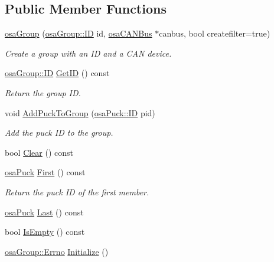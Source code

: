 \subsection*{Public Member Functions}
\begin{DoxyCompactItemize}
\item 
\hyperlink{classosa_group_a625dc997d81d164cdb1a1069cd3e35af}{osa\+Group} (\hyperlink{classosa_group_a642da327f9e3c40d46293432b949f199}{osa\+Group\+::\+I\+D} id, \hyperlink{classosa_c_a_n_bus}{osa\+C\+A\+N\+Bus} $\ast$canbus, bool createfilter=true)
\begin{DoxyCompactList}\small\item\em Create a group with an I\+D and a C\+A\+N device. \end{DoxyCompactList}\item 
\hyperlink{classosa_group_a642da327f9e3c40d46293432b949f199}{osa\+Group\+::\+I\+D} \hyperlink{classosa_group_a2f66e224affed939860f323d5a37145a}{Get\+I\+D} () const 
\begin{DoxyCompactList}\small\item\em Return the group I\+D. \end{DoxyCompactList}\item 
void \hyperlink{classosa_group_af9d9add8260af2a3358559680f369300}{Add\+Puck\+To\+Group} (\hyperlink{classosa_puck_aa484456bae759574accdc76fe68b4685}{osa\+Puck\+::\+I\+D} pid)
\begin{DoxyCompactList}\small\item\em Add the puck I\+D to the group. \end{DoxyCompactList}\item 
bool \hyperlink{classosa_group_af0aebeae4a7bee384ef5b46752c5f097}{Clear} () const 
\item 
\hyperlink{classosa_puck}{osa\+Puck} \hyperlink{classosa_group_aaf13608ea9c6e64013e4e3d26d364004}{First} () const 
\begin{DoxyCompactList}\small\item\em Return the puck I\+D of the first member. \end{DoxyCompactList}\item 
\hyperlink{classosa_puck}{osa\+Puck} \hyperlink{classosa_group_ae2ea8dea45cfdc5695f93ef6fa7a8848}{Last} () const 
\item 
bool \hyperlink{classosa_group_a2e1bb4b5a64dff04ce939c76adf63038}{Is\+Empty} () const 
\item 
\hyperlink{classosa_group_a3ac590c39198a7533838db29b01b994f}{osa\+Group\+::\+Errno} \hyperlink{classosa_group_a290e66f56d5657b137837ce7e23b1667}{Initialize} ()

\end{DoxyCompactItemize}
